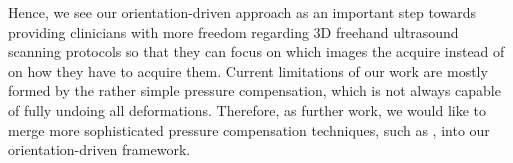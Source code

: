 Hence, we see our orientation-driven approach as an important step towards providing clinicians with more freedom regarding 3D freehand ultrasound scanning protocols so that they can focus on which images the acquire instead of on how they have to acquire them.
Current limitations of our work are mostly formed by the rather simple pressure compensation, which is not always capable of fully undoing all deformations.
Therefore, as further work, we would like to merge more sophisticated pressure compensation techniques, such as \cite{Treece02}, into our orientation-driven framework.

